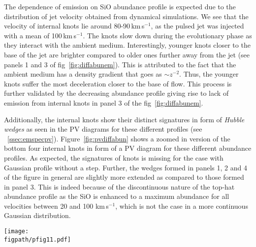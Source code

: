\documentclass[useAMS,usenatbib]{mn2e}
\newcommand{\figpath}{/home/phybva/SiOJets_New/PAPER/NEWFIGS}
\begin{document}
The dependence of emission on SiO abundance profile is expected due to
the distribution of jet velocity obtained from dynamical
simulations. We see that the velocity of internal knots lie around
80-90\,km\,s$^{-1}$, as the pulsed jet was injected with a mean of
100\,km\,s$^{-1}$. The knots slow down during the evolutionary
phase as they interact with the ambient medium. Interestingly, younger
knots closer to the base of the jet are brighter compared to older
ones further away from the jet (see panels 1 and 3 of
fig~\ref{fig:diffabunem}). This is attributed to the fact that the
ambient medium has a density gradient that goes as $\sim
z^{-2}$. Thus, the younger knots suffer the most deceleration closer
to the base of flow. This process is further validated by
the decreasing abundance profile giving rise to 
lack of emission from internal knots in panel 3 of the fig~\ref{fig:diffabunem}. 
%

Additionally, the internal knots show their distinct signatures in
form of {\em Hubble wedges} as seen in the PV diagrams for these
different profiles (see
~\ref{ssec:emspecpv}). Figure~\ref{fig:pvdiffabun} shows a zoomed in
version of the bottom four internal knots in form of a PV diagram for these
different abundance profiles. As expected, the signatures of knots 
is missing for the case with Gaussian profile without a step.
Further, the wedges formed in panels 1, 2 and 4 of the figure in
general are slightly more extended as compared to those
formed in panel 3. This is indeed because of the
discontinuous nature of the top-hat abundance profile as the SiO is
enhanced to a maximum abundance for all velocities between 20 and 100
km\,s$^{-1}$, which is not the case in a more continuous Gaussian
distribution.

\begin{figure*}
 \texttt{[image: \\figpath/pfig11.pdf]}%
 \caption{Position-velocity maps of SiO(2-1) for the internal
   knots produced in the model with reference parameters and different abundance
   profiles. The contours mark different levels of emission in Kelvins, viz.,
   0.1,0.2,0.6,1.0,1.4,1.8,2.0,3.0,4.0.}
\label{fig:pvdiffabun}
\end{figure*}
   
 
\end{document}
